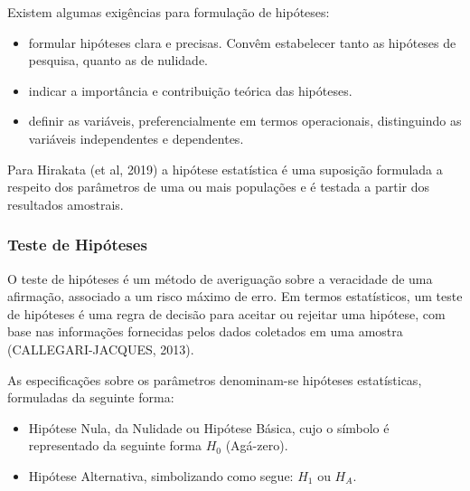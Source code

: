 Existem algumas exigências para formulação de hipóteses:

\begin{itemize}
\item formular hipóteses clara e precisas. Convêm estabelecer tanto as hipóteses de pesquisa, quanto as de nulidade.  
\item indicar a importância e contribuição teórica das hipóteses.
\item definir as variáveis, preferencialmente em termos operacionais, distinguindo as variáveis independentes e dependentes. 
\end{itemize}

Para Hirakata (et al, 2019) a hipótese estatística é uma suposição formulada a respeito dos parâmetros de uma ou mais populações e é testada a partir dos resultados amostrais. 

\subsubsection{Teste de Hipóteses}

O teste de hipóteses é um método de averiguação sobre a veracidade de uma afirmação, associado a um risco máximo de erro. Em termos estatísticos, um teste de hipóteses é uma regra de decisão para aceitar ou rejeitar uma hipótese, com base nas informações fornecidas pelos dados coletados em uma amostra (CALLEGARI-JACQUES, 2013).\vskip0.3cm








As especificações sobre os parâmetros denominam-se hipóteses estatísticas, formuladas da seguinte forma:

\begin{itemize}
\item Hipótese Nula, da Nulidade ou Hipótese Básica, cujo o símbolo é representado da seguinte forma $H_{0}$ (Agá-zero).
\item Hipótese Alternativa, simbolizando como segue: $H_{1}$ ou $H_{A}$.
\end{itemize}

